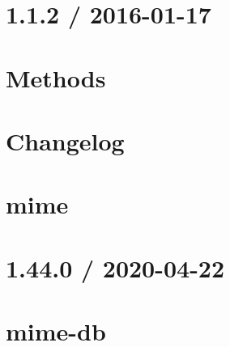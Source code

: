 \let\mypdfximage\pdfximage\def\pdfximage{\immediate\mypdfximage}\documentclass[twoside]{book}
\newcommand{\+}{\discretionary{\mbox{\scriptsize$\hookleftarrow$}}{}{}}
\begin{document}
\chapter{1.1.2 / 2016-\/01-\/17}
\label{md__c_1__git_hub__p_r_o_y_e_c_t_o-_i_i_i-_g_o_t_rest-api_node_modules_methods__h_i_s_t_o_r_y}

\chapter{Methods}
\label{md__c_1__git_hub__p_r_o_y_e_c_t_o-_i_i_i-_g_o_t_rest-api_node_modules_methods__r_e_a_d_m_e}

\chapter{Changelog}
\label{md__c_1__git_hub__p_r_o_y_e_c_t_o-_i_i_i-_g_o_t_rest-api_node_modules_mime__c_h_a_n_g_e_l_o_g}

\chapter{mime}
\label{md__c_1__git_hub__p_r_o_y_e_c_t_o-_i_i_i-_g_o_t_rest-api_node_modules_mime__r_e_a_d_m_e}

\chapter{1.44.0 / 2020-\/04-\/22}
\label{md__c_1__git_hub__p_r_o_y_e_c_t_o-_i_i_i-_g_o_t_rest-api_node_modules_mime-db__h_i_s_t_o_r_y}

\chapter{mime-\/db}
\label{md__c_1__git_hub__p_r_o_y_e_c_t_o-_i_i_i-_g_o_t_rest-api_node_modules_mime-db__r_e_a_d_m_e}

\end{document}
